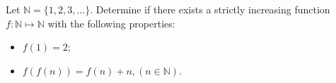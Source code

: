 Let $\mathbb{N} = \{1,2,3, \ldots\}$. Determine if there exists a strictly increasing function $f: \mathbb{N} \mapsto \mathbb{N}$ with the following properties:

\begin{itemize}
	\item $f(1) = 2$;
	\item $f(f(n)) = f(n) + n, (n \in \mathbb{N})$.
\end{itemize}
